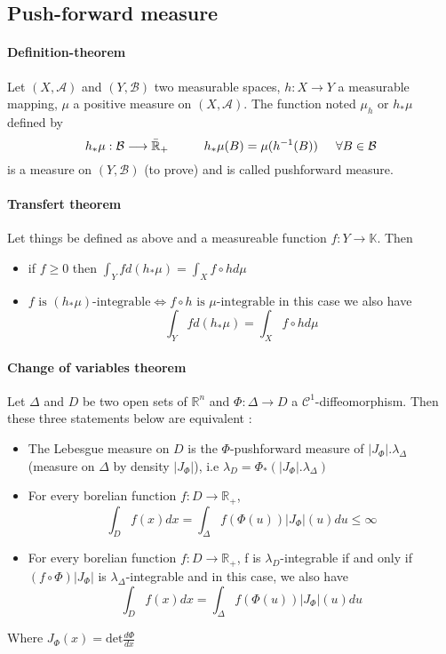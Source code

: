 \documentclass[a4paper,10pt]{article}
\begin{document}
\subsection{Push-forward measure} 

\paragraph{Definition-theorem} Let $(X,\mathcal{A})$ and $(Y,\mathcal{B})$ two measurable spaces, $h:X\longrightarrow Y$ a measurable mapping, $\mu$ a positive measure on $(X,\mathcal{A})$. The function noted $\mu_h$ or $h_{*}\mu$ defined by 
\[
h_{*}\mu : \mathcal{B} \longrightarrow \bar{\mathbb{R}}_+  \hspace{10mm} h_{*}\mu(B) = \mu(h^{-1}(B))     \hspace{5mm} \forall B \in \mathcal{B}
\]
is a measure on $(Y,\mathcal{B})$ (to prove) and is called pushforward measure. 

\paragraph{Transfert theorem} Let things be defined as above and a measureable function $f:Y\longrightarrow \mathbb{K}$. Then
\begin{itemize}
\renewcommand{\labelitemi}{$\vcenter{\hbox{\tiny$\bullet$}}$}
 \item if $f \geq 0$ then $\int_Y f d(h_{*}\mu) = \int_X f\circ h d\mu$
 \item $f \text{ is } (h_{*}\mu)\text{-integrable} \Longleftrightarrow f\circ h \text{ is } \mu\text{-integrable}$ in this case we also have
 \[\int_Y f d(h_{*}\mu) = \int_X f\circ h d\mu\]
\end{itemize}

\paragraph{Change of variables theorem}
Let $\varDelta$ and $D$ be two open sets of $\mathbb{R}^n$ and $\Phi:\varDelta \longrightarrow D$ a $\mathcal{C}^1$-diffeomorphism. Then these three statements below are equivalent :
\begin{itemize}
 \item The Lebesgue measure on $D$ is the $\Phi$-pushforward measure of $|J_{\Phi}|.\lambda_{\varDelta}$ (measure on $\varDelta$ by density $|J_{\Phi}|$), i.e  $\lambda_{D} = \Phi_{*}(|J_{\Phi}|.\lambda_{\varDelta})$
 \item For every borelian function $f : D \longrightarrow \mathbb{R}_+$,
 \[
 \int_D f(x)dx = \int_{\varDelta} f(\Phi(u)) |J_{\Phi}|(u) du \leq \infty
 \]
 \item For every borelian function $f : D \longrightarrow \mathbb{R}_+$, f is $\lambda_{D}$-integrable  if and only if $(f\circ \Phi) |J_{\Phi}|$ is $\lambda_{\varDelta}$-integrable and in this case, we also have 
  \[
 \int_D f(x)dx = \int_{\varDelta} f(\Phi(u)) |J_{\Phi}|(u) du
 \]
\end{itemize}
Where $J_{\Phi}(x)= \text{det} \frac{d\Phi}{dx} $
\end{document}
